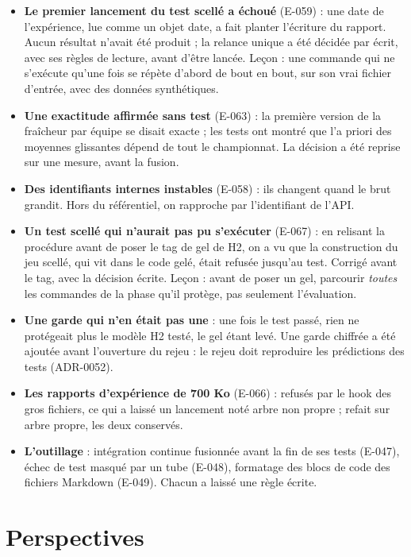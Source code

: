 \begin{itemize}
  \item \textbf{Le premier lancement du test scellé a échoué} (E-059) : une date de l'expérience, lue
        comme un objet date, a fait planter l'écriture du rapport. Aucun résultat n'avait été produit ;
        la relance unique a été décidée par écrit, avec ses règles de lecture, avant d'être lancée.
        Leçon : une commande qui ne s'exécute qu'une fois se répète d'abord de bout en bout, sur son
        vrai fichier d'entrée, avec des données synthétiques.
  \item \textbf{Une exactitude affirmée sans test} (E-063) : la première version de la fraîcheur par
        équipe se disait exacte ; les tests ont montré que l'a priori des moyennes glissantes dépend de
        tout le championnat. La décision a été reprise sur une mesure, avant la fusion.
  \item \textbf{Des identifiants internes instables} (E-058) : ils changent quand le brut grandit. Hors du
        référentiel, on rapproche par l'identifiant de l'API.
  \item \textbf{Un test scellé qui n'aurait pas pu s'exécuter} (E-067) : en relisant la procédure avant de
        poser le tag de gel de H2, on a vu que la construction du jeu scellé, qui vit dans le code gelé,
        était refusée jusqu'au test. Corrigé avant le tag, avec la décision écrite. Leçon : avant de poser un
        gel, parcourir \emph{toutes} les commandes de la phase qu'il protège, pas seulement l'évaluation.
  \item \textbf{Une garde qui n'en était pas une} : une fois le test passé, rien ne protégeait plus le modèle
        H2 testé, le gel étant levé. Une garde chiffrée a été ajoutée avant l'ouverture du rejeu : le rejeu
        doit reproduire les prédictions des tests (ADR-0052).
  \item \textbf{Les rapports d'expérience de 700 Ko} (E-066) : refusés par le hook des gros fichiers, ce qui
        a laissé un lancement noté \og arbre non propre \fg{} ; refait sur arbre propre, les deux conservés.
  \item \textbf{L'outillage} : intégration continue fusionnée avant la fin de ses tests (E-047), échec de
        test masqué par un tube (E-048), formatage des blocs de code des fichiers Markdown (E-049).
        Chacun a laissé une règle écrite.
\end{itemize}

\section{Perspectives}

